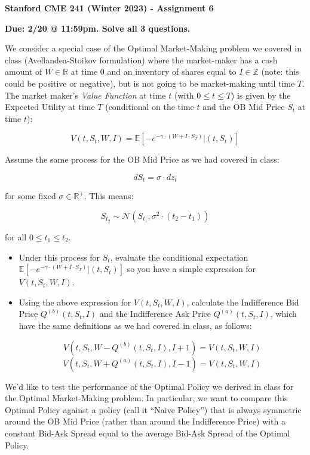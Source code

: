\documentclass[12pt]{exam}
\begin{document}
\begin{center}
{\large {\bf Stanford CME 241 (Winter 2023) - Assignment 6}}
\end{center}
 
{\large{\bf Due: 2/20 @ 11:59pm. Solve all 3 questions.}}
\begin{questions}
\question We consider a special case of the Optimal Market-Making problem we covered in class (Avellandea-Stoikov formulation) where the market-maker has a cash amount of $W \in \mathbb{R}$ at time 0 and an inventory of shares equal to $I \in \mathbb{Z}$ (note: this could be positive or negative), but is not going to be market-making until time $T$. The market maker's {\em Value Function} at time $t$ (with $0 \leq t \leq T$) is given by the Expected Utility at time $T$ (conditional on the time $t$ and the OB Mid Price $S_t$ at time $t$):

$$V(t, S_t, W, I) = \mathbb{E}[-e^{-\gamma \cdot (W + I \cdot S_T)} | (t, S_t)]$$

Assume the same process for the OB Mid Price as we had covered in class:

$$dS_t = \sigma \cdot dz_t$$

for some fixed $\sigma \in \mathbb{R}^+$. This means:

$$S_{t_2} \sim \mathcal{N}(S_{t_1}, \sigma^2 \cdot (t_2 - t_1))$$

for all $0 \leq t_1 \leq t_2$.

\begin{itemize}
\item Under this process for $S_t$, evaluate the conditional expectation $\mathbb{E}[-e^{-\gamma \cdot (W + I \cdot S_T)} | (t, S_t)]$ so you have a simple expression for $V(t, S_t, W, I)$.
\item Using the above expression for $V(t, S_t, W, I)$, calculate the Indifference Bid Price $Q^{(b)}(t, S_t, I)$ and the Indifference Ask Price $Q^{(a)}(t,S_t,I)$, which have the same definitions as we had covered in class, as follows:

$$V(t,S_t,W - Q^{(b)}(t, S_t, I), I + 1) = V(t,S_t,W, I)$$
$$V(t,S_t,W + Q^{(a)}(t, S_t, I), I - 1) = V(t,S_t,W, I)$$
\end{itemize}

\question We'd like to test the performance of the Optimal Policy we derived in class for the Optimal Market-Making problem. In particular, we want to compare this Optimal Policy against a policy (call it ``Naive Policy'') that is always symmetric around the OB Mid Price (rather than around the Indifference Price) with a constant Bid-Ask Spread equal to the average Bid-Ask Spread of the Optimal Policy.


\end{questions}
\end{document}
